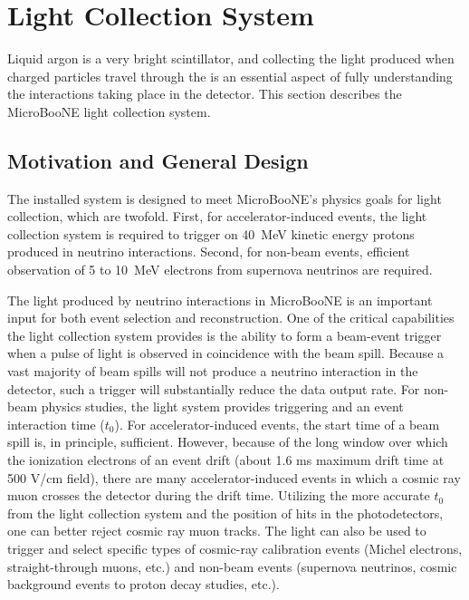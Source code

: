 
%

\section{Light Collection System}
\label{sec:light-collection}

Liquid argon is a very bright scintillator, and collecting the light produced when charged particles travel through the \lartpc is an essential aspect of fully understanding the interactions taking place in the detector.  This section describes the MicroBooNE light collection system.



\subsection{Motivation and General Design \label{sint}}

The installed system is designed to meet MicroBooNE's physics goals for light collection, which are twofold.
First, for accelerator-induced events, the light collection system is required to trigger on 40~MeV kinetic energy protons produced in neutrino interactions.  Second, for non-beam events,  efficient observation of 5 to 10~MeV electrons from supernova neutrinos are required.   

The light produced by neutrino interactions in MicroBooNE is an important input for both event selection and reconstruction.  
One of the critical capabilities the light collection system provides is the ability to form a beam-event trigger when a pulse of light is observed in coincidence with the beam spill.  Because a vast majority of beam spills will not produce a neutrino interaction in the detector, such a trigger will substantially reduce the data output rate.  
For non-beam physics studies, the light system provides triggering and an event interaction time ($t_0$). For accelerator-induced events, the start time of a beam spill is, in principle, sufficient.  
However, because of the long window over which the ionization electrons of an event drift (about 1.6 ms maximum drift time at 500 V/cm field), there are many accelerator-induced events in which a cosmic ray muon crosses the detector during the drift time.  Utilizing the more accurate $t_0$ from the light collection system and the position of hits in the photodetectors, one can better reject cosmic ray muon tracks.  
The light can also be used to trigger and select specific types of cosmic-ray calibration events (Michel electrons, straight-through muons, etc.) and non-beam events (supernova neutrinos, cosmic background events to proton decay studies, etc.).



